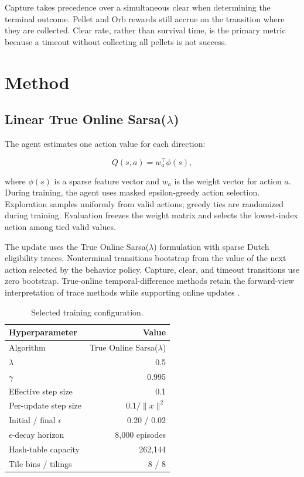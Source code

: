 \documentclass[11pt]{article}
\begin{document}
Capture takes precedence over a simultaneous clear when determining the
terminal outcome. Pellet and Orb rewards still accrue on the transition where
they are collected. Clear rate, rather than survival time, is the primary
metric because a timeout without collecting all pellets is not success.

\section{Method}

\subsection{Linear True Online Sarsa($\lambda$)}

The agent estimates one action value for each direction:

\begin{equation}
  Q(s,a) = w_a^\top \phi(s),
\end{equation}

where $\phi(s)$ is a sparse feature vector and $w_a$ is the weight vector for
action $a$. During training, the agent uses masked epsilon-greedy action
selection. Exploration samples uniformly from valid actions; greedy ties are
randomized during training. Evaluation freezes the weight matrix and selects
the lowest-index action among tied valid values.

The update uses the True Online Sarsa($\lambda$) formulation with sparse Dutch
eligibility traces. Nonterminal transitions bootstrap from the value of the
next action selected by the behavior policy. Capture, clear, and timeout
transitions use zero bootstrap. True-online temporal-difference methods retain
the forward-view interpretation of trace methods while supporting online
updates \cite{van-seijen-2016}.

\begin{table}[ht]
\centering
\caption{Selected training configuration.}
\label{tab:hyperparameters}
\small
\begin{tabular}{lr}
\toprule
Hyperparameter & Value \\
\midrule
Algorithm & True Online Sarsa($\lambda$) \\
$\lambda$ & 0.5 \\
$\gamma$ & 0.995 \\
Effective step size & 0.1 \\
Per-update step size & $0.1 / \lVert x \rVert^2$ \\
Initial / final $\epsilon$ & 0.20 / 0.02 \\
$\epsilon$-decay horizon & 8,000 episodes \\
Hash-table capacity & 262,144 \\
Tile bins / tilings & 8 / 8 \\
\bottomrule
\end{tabular}
\end{table}
\end{document}
